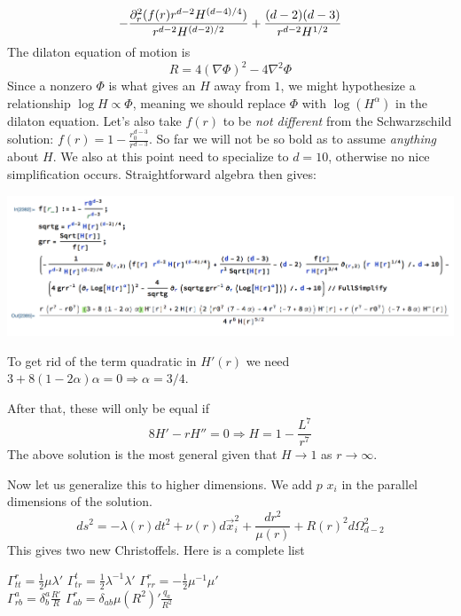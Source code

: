 \documentclass[11pt, class=article, crop=false]{standalone}
\begin{document}
\begin{enumerate}
	\[
		 - \frac{\d_r^2 (f(r) r^{d-2} H^{(d-4)/4})}{r^{d-2} H^{(d-2)/2}} + \frac{(d-2) (d-3)}{r^{d-2} H^{1/2}} %
	\]
	The dilaton equation of motion is
	\[
		R = 4 (\nabla \Phi)^2 - 4 \nabla^2 \Phi
	\]
	Since a nonzero $\Phi$ is what gives an $H$ away from $1$, we might hypothesize a relationship $\log H \propto \Phi$, meaning we should replace $\Phi$ with $\log(H^{\alpha})$ in the dilaton equation. Let's also take $f(r)$ to be \emph{not different} from the Schwarzschild solution: $f(r) = 1- \frac{r_0^{d-3}}{r^{d-3}}$. 
	So far we will not be so bold as to assume \emph{anything} about $H$. We also at this point need to specialize to $d=10$, otherwise no nice simplification occurs. Straightforward algebra then gives:
	\begin{center}
		\includegraphics[scale=0.5]{"Figures/nonextremal"}
	\end{center}
	
	To get rid of the term quadratic in $H'(r)$ we need $3 + 8(1-2\alpha) \alpha = 0 \Rightarrow \alpha = 3/4$. 

	After that, these will only be equal if
	\[
		8 H' - r H'' = 0 \Rightarrow H = 1 - \frac{L^7}{r^7}
	\]
	The above solution is the most general given that $H \to 1$ as $r \to \infty$. 
	
	Now let us generalize this to higher dimensions. We add $p$ $x_i$ in the parallel dimensions of the solution.
	\[
		ds^2 = - \lambda(r) dt^2 + \nu(r) d\vec x_i^2 + \frac{dr^2}{\mu(r)}  + R(r)^2 d\Omega_{d-2}^2
	\]
	 This gives two new Christoffels. Here is a complete list
	\begin{center}
			$\Gamma^r_{tt} = \frac12 \mu \lambda'$  \qquad $\Gamma^t_{tr} = \frac12 \lambda^{-1} \lambda'$ \qquad $\Gamma^r_{rr} = -\frac12 \mu^{-1} \mu'$\\
			$\Gamma^a_{rb} = \delta^a_b \frac{R'}{R}$ \qquad $\Gamma^r_{ab} = \delta_{ab} \mu (R^2)' \frac{q_a}{R^2}$ \\
			

\end{center}
\end{enumerate}
\end{document}
